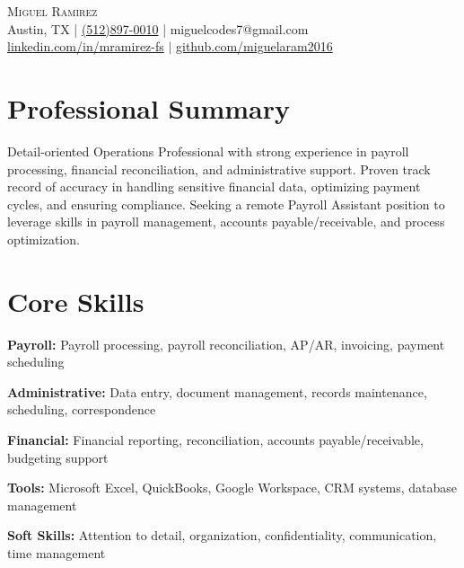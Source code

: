 \documentclass[letterpaper,10pt]{article}
\begin{document}
\begin{center}
  {\Large \scshape Miguel Ramirez} \\ \vspace{1pt}
  Austin, TX | \href{tel:+15128970010}{(512)897-0010} | miguelcodes7@gmail.com \\ 
  \href{https://linkedin.com/in/mramirez-fs}{linkedin.com/in/mramirez-fs} $|$
  \href{https://github.com/miguelaram2016}{github.com/miguelaram2016}
\end{center}

\section*{Professional Summary}
\begin{compactitem}
  \item[]
    Detail-oriented Operations Professional with strong experience in payroll processing, financial reconciliation, and administrative support. Proven track record of accuracy in handling sensitive financial data, optimizing payment cycles, and ensuring compliance. Seeking a remote Payroll Assistant position to leverage skills in payroll management, accounts payable/receivable, and process optimization.
\end{compactitem}

\section*{Core Skills}
\begin{compactitem}
  \item[]
    \textbf{Payroll:} Payroll processing, payroll reconciliation, AP/AR, invoicing, payment scheduling
    \item[]
    \textbf{Administrative:} Data entry, document management, records maintenance, scheduling, correspondence
    \item[]
    \textbf{Financial:} Financial reporting, reconciliation, accounts payable/receivable, budgeting support
    \item[]
    \textbf{Tools:} Microsoft Excel, QuickBooks, Google Workspace, CRM systems, database management
    \item[]
    \textbf{Soft Skills:} Attention to detail, organization, confidentiality, communication, time management
\end{compactitem}

\end{document}
